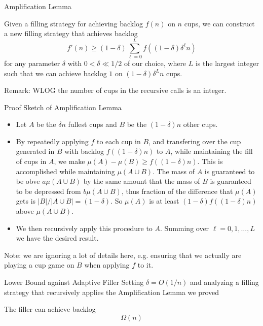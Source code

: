 \documentclass[xcolor=x11names, svgnames, rgb]{beamer}
\begin{document}
\begin{frame}[t]{Amplification Lemma}
  \begin{lemma}
    Given a filling strategy for achieving backlog $f(n)$ on $n$ cups, we can construct a new filling strategy that achieves backlog 
    $$f'(n) \ge (1-\delta)\sum_{\ell=0}^L f((1-\delta)\delta^\ell n)$$
    for any parameter $\delta$ with $0 < \delta \ll 1/2$ of our choice, where $L$
    is the largest integer such that we can achieve backlog $1$ on
    $(1-\delta)\delta^Ln$ cups.%
  \end{lemma}
  Remark: WLOG the number of cups in the recursive calls is an integer.
  
\end{frame}

\begin{frame}[t]{Proof Sketch of Amplification Lemma}
  \begin{itemize}
    \item Let $A$ be the $\delta n$ fullest cups and $B$ be the $(1-\delta)n$ other cups.
    \item By repeatedly applying $f$ to each cup in $B$, and transfering over
      the cup generated in $B$ with backlog $f((1-\delta)n)$ to $A$, while maintaining the fill of cups in $A$, we make
      $\mu (A) - \mu (B) \ge f((1-\delta)n)$. This is accomplished while
      maintaining $\mu(A\cup B)$. The mass of $A$ is guaranteed to be obve
      $a\mu(A\cup B)$ by the same amount that the mass of $B$ is guaranteed to
      be depressed from $b\mu(A\cup B)$, thus fraction of the difference that
      $\mu(A)$ gets is $|B|/|A\cup B| = (1-\delta)$. So $\mu(A)$ is at least
      $(1-\delta)f((1-\delta)n)$ above $\mu(A\cup B)$.
    \item We then recursively apply this procedure to $A$. Summing over $\ell = 0,1, \ldots, L$ we have the desired result.
  \end{itemize} 

  Note: we are ignoring a lot of details here, e.g. ensuring that we actually are playing a cup game on $B$ when applying $f$ to it.
\end{frame}

\begin{frame}[t]{Lower Bound against Adaptive Filler}
  Setting $\delta = O(1/n)$ and analyzing a filling strategy that  recursively
  applies the Amplification Lemma we proved
  \begin{corollary}
    The filler can achieve backlog 
    $$\Omega(n)$$
  \end{corollary}
\end{frame}
\end{document}
